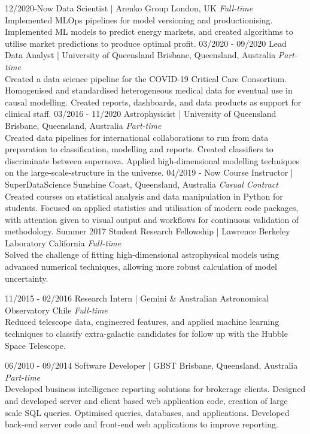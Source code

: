 \documentclass[11pt]{friggeri-cv}
\begin{document}
\begin{entrylist}
\entry
{12/2020-Now}
{Data Scientist | Arenko Group}
{London, UK}
{\emph{Full-time} \\
Implemented MLOps pipelines for model versioning and productionising. Implemented ML models to predict energy markets, and created algorithms to utilise market predictions to produce optimal profit.}
\entry
{03/2020 - 09/2020}
{Lead Data Analyst | University of Queensland}
{Brisbane, Queensland, Australia}
{\emph{Part-time} \\
Created a data science pipeline for the COVID-19 Critical Care Consortium. Homogenised and standardised heterogeneous medical data for eventual use in causal modelling. Created reports, dashboards, and data products as support for clinical staff.}
\entry
{03/2016 - 11/2020}
{Astrophysicist | University of Queensland}
{Brisbane, Queensland, Australia}
{\emph{Part-time} \\
Created data pipelines for international collaborations to run from data preparation to classification, modelling and reports. Created classifiers to discriminate between supernova. Applied high-dimensional modelling techniques on the large-scale-structure in the universe.}
\entry
{04/2019 - Now}
{Course Instructor | SuperDataScience}
{Sunshine Coast, Queensland, Australia}
{\emph{Casual Contract} \\
Created courses on statistical analysis and data manipulation in Python for students. Focused on applied statistics and utilisation of modern code packages, with attention given to visual output and workflows for continuous validation of methodology.}
\entry
{Summer 2017}
{Student Research Fellowship | Lawrence Berkeley Laboratory}
{ California}
{ \emph{Full-time} \\
Solved the challenge of fitting high-dimensional astrophysical models using advanced numerical techniques, allowing more robust calculation of model uncertainty.}
\end{entrylist}
\begin{entrylist}
\entry
{11/2015 - 02/2016}
{Research Intern | Gemini \& Australian Astronomical Observatory}
{Chile}
{\emph{Full-time} \\
Reduced telescope data, engineered features, and applied machine learning techniques to classify extra-galactic candidates for follow up with the Hubble Space Telescope.}
\end{entrylist}
\begin{entrylist}
\entry
{06/2010 - 09/2014}
{Software Developer | GBST}
{Brisbane, Queensland, Australia}
{\emph{Part-time} \\
Developed business intelligence reporting solutions for brokerage clients. Designed and developed server and client based web application code, creation of large scale SQL queries. Optimised queries, databases, and applications. Developed back-end server code and front-end web applications to improve reporting.}

\end{entrylist}
\end{document}
